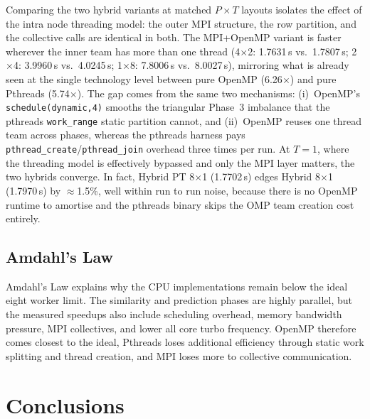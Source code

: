 \documentclass[11pt,a4paper]{article}
\newcommand{\code}[1]{\texttt{\small #1}}
\begin{document}
Comparing the two hybrid variants at matched $P\times T$ layouts isolates the
effect of the intra node threading model: the outer MPI structure, the row
partition, and the collective calls are identical in both. The MPI+OpenMP
variant is faster wherever the inner team has more than one thread
(4$\times$2: 1.7631\,s vs.\ 1.7807\,s; 2$\times$4: 3.9960\,s vs.\ 4.0245\,s;
1$\times$8: 7.8006\,s vs.\ 8.0027\,s), mirroring what is already seen at the
single technology level between pure OpenMP (6.26$\times$) and pure Pthreads
(5.74$\times$). The gap comes from the same two mechanisms: (i)~OpenMP's
\code{schedule(dynamic,4)} smooths the triangular Phase~3 imbalance that the
pthreads \code{work\_range} static partition cannot, and (ii)~OpenMP reuses
one thread team across phases, whereas the pthreads harness pays
\code{pthread\_create}/\code{pthread\_join} overhead three times per run. At
$T{=}1$, where the threading model is effectively bypassed and only the MPI
layer matters, the two hybrids converge. In fact, Hybrid PT 8$\times$1
(1.7702\,s) edges Hybrid 8$\times$1 (1.7970\,s) by $\approx$1.5\%, well within
run to run noise, because there is no OpenMP runtime to amortise and the
pthreads binary skips the OMP team creation cost entirely.

\subsection{Amdahl's Law}\label{sec:amdahl}

Amdahl's Law explains why the CPU implementations remain below the ideal
eight worker limit. The similarity and prediction phases are highly parallel,
but the measured speedups also include scheduling overhead, memory bandwidth
pressure, MPI collectives, and lower all core turbo frequency. OpenMP therefore
comes closest to the ideal, Pthreads loses additional efficiency through static
work splitting and thread creation, and MPI loses more to collective
communication.

\section{Conclusions}\label{sec:conclusions}
\end{document}
